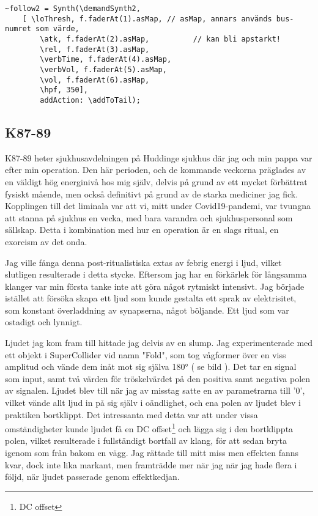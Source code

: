 \documentclass{article}
\begin{document}
\begin{lstlisting}[style=SuperCollider-IDE, caption=Syntens kontrollschema]
~follow2 = Synth(\demandSynth2, 
	[ \loThresh, f.faderAt(1).asMap, // asMap, annars används bus-numret som värde,
		\atk, f.faderAt(2).asMap,		   // kan bli apstarkt!
		\rel, f.faderAt(3).asMap,
		\verbTime, f.faderAt(4).asMap,
		\verbVol, f.faderAt(5).asMap,
		\vol, f.faderAt(6).asMap,
		\hpf, 350],
		addAction: \addToTail); 
\end{lstlisting}

  \subsection{K87-89}
  K87-89 heter sjukhusavdelningen på Huddinge sjukhus där jag och min pappa var efter min operation. Den här
  perioden, och de kommande veckorna präglades av en väldigt hög energinivå hos mig själv, delvis på grund av
  ett mycket förbättrat fysiskt mående, men också definitivt på grund av de starka mediciner jag fick.
  Kopplingen till det liminala var att vi, mitt under Covid19-pandemi, var tvungna att stanna på sjukhus en
  vecka, med bara varandra och sjukhuspersonal som sällskap. Detta i kombination med hur en operation är en
  slags ritual, en exorcism av det onda. 

  Jag ville fånga denna post-ritualistiska extas av febrig energi i ljud, vilket slutligen resulterade i detta
  stycke. Eftersom jag har en förkärlek för långsamma klanger var min första tanke inte att göra något
  rytmiskt intensivt. Jag började istället att försöka skapa ett ljud som kunde gestalta ett sprak av
  elektrisitet, som konstant överladdning av synapserna, något böljande. Ett ljud som var ostadigt och
  lynnigt. 

  Ljudet jag kom fram till hittade jag delvis av en slump. Jag experimenterade med ett objekt i
  SuperCollider vid namn "Fold", som tog vågformer över en viss amplitud och vände dem inåt mot sig själva
  180° ( se bild ). Det tar en signal som input, samt två värden för tröskelvärdet på den positiva samt
  negativa polen av signalen. Ljudet blev till när jag av misstag satte en av parametrarna till '0', vilket
  vände allt ljud in på sig själv i oändlighet, och ena polen av ljudet blev i praktiken bortklippt. Det
  intressanta med detta var att under vissa omständigheter kunde ljudet få en DC offset\footnote{DC offset}
  och lägga sig i den bortklippta polen, vilket resulterade i fullständigt bortfall av klang, för att sedan
  bryta igenom som från bakom en vägg. Jag rättade till mitt miss men effekten fanns kvar, dock inte lika
  markant, men framträdde mer när jag när jag hade flera i följd, när ljudet passerade genom effektkedjan.
\end{document}
